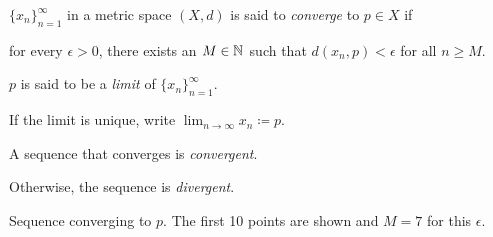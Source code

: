 \documentclass[10pt,aspectratio=149]{beamer}
\begin{document}
\begin{frame}

\begin{definition}
$\{ x_n \}_{n=1}^\infty$ in a metric space $(X,d)$ is said
to \emph{converge} to 
$p \in X$ if

for every $\epsilon > 0$, there exists an $M \in {\mathbb{N}}$ such
that $d(x_n,p) < \epsilon$ for all $n \geq M$.

\pause
\medskip

$p$
is said to be a \emph{limit}
of $\{ x_n \}_{n=1}^\infty$.

\pause
\medskip

If the limit is unique, write
\quad $\displaystyle
\lim_{n\to \infty} x_n \coloneqq p$.

\pause
\medskip

A sequence that converges is \emph{convergent}.

\pause
Otherwise, the sequence is \emph{divergent}.
\end{definition}

\pause
\medskip

\begin{center}
\end{center}

Sequence converging to $p$.  The first 10 points 
are shown and $M=7$ for this $\epsilon$.

\end{frame}
\end{document}
